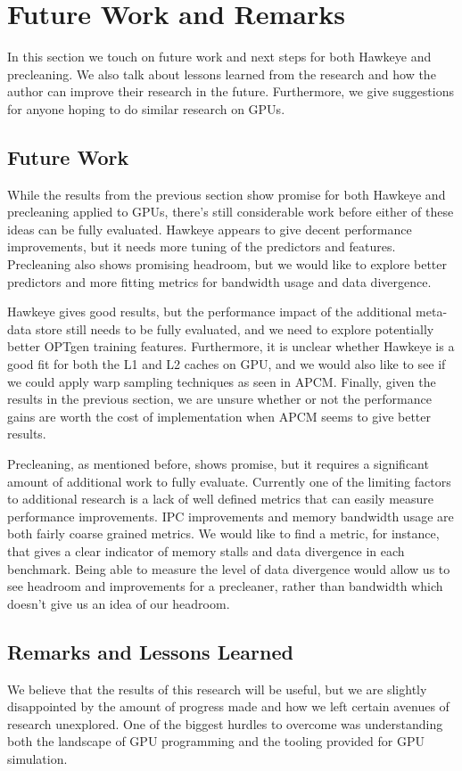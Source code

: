 \chapter{Future Work and Remarks}
In this section we touch on future work and next steps for both Hawkeye and precleaning. We also talk about lessons learned from the research and how the author can improve their research in the future. Furthermore, we give suggestions for anyone hoping to do similar research on GPUs.

\section{Future Work}
While the results from the previous section show promise for both Hawkeye and precleaning applied to GPUs, there's still considerable work before either of these ideas can be fully evaluated. Hawkeye appears to give decent performance improvements, but it needs more tuning of the predictors and features. Precleaning also shows promising headroom, but we would like to explore better predictors and more fitting metrics for bandwidth usage and data divergence.

Hawkeye gives good results, but the performance impact of the additional meta-data store still needs to be fully evaluated, and we need to explore potentially better OPTgen training features. Furthermore, it is unclear whether Hawkeye is a good fit for both the L1 and L2 caches on GPU, and we would also like to see if we could apply warp sampling techniques as seen in APCM. Finally, given the results in the previous section, we are unsure whether or not the performance gains are worth the cost of implementation when APCM seems to give better results.

Precleaning, as mentioned before, shows promise, but it requires a significant amount of additional work to fully evaluate. Currently one of the limiting factors to additional research is a lack of well defined metrics that can easily measure performance improvements. IPC improvements and memory bandwidth usage are both fairly coarse grained metrics. We would like to find a metric, for instance, that gives a clear indicator of memory stalls and data divergence in each benchmark. Being able to measure the level of data divergence would allow us to see headroom and improvements for a precleaner, rather than bandwidth which doesn't give us an idea of our headroom.

\section{Remarks and Lessons Learned}
We believe that the results of this research will be useful, but we are slightly disappointed by the amount of progress made and how we left certain avenues of research unexplored. One of the biggest hurdles to overcome was understanding both the landscape of GPU programming and the tooling provided for GPU simulation.

